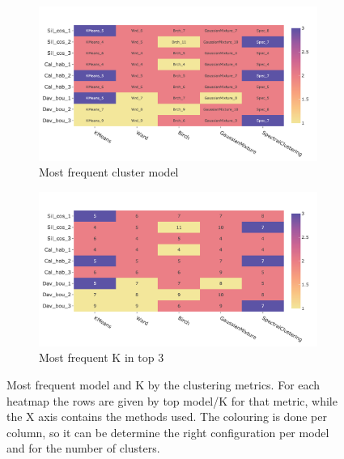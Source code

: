 \begin{figure}[!htb]
    \captionsetup[subfigure]{justification=Centering}
    \centering
    \begin{subfigure}[!t]{0.49\textwidth}
        \includegraphics[width=\textwidth]{Sections/ClusteringAnalysis/Resources/cs_top3/top3_cs_gen_top3_heatmap_pca.png}
        \caption{Most frequent cluster model}
        \label{fig:cs:heatmap_gen}
    \end{subfigure}
    \centering
    \begin{subfigure}[!t]{0.49\textwidth}
        \includegraphics[width=\textwidth]{Sections/ClusteringAnalysis/Resources/cs_top3/top3_cs_size_top3_heatmap_pca.png}
        \caption{Most frequent K in top 3}
        \label{fig:cs:heatmap_cs}
    \end{subfigure}
    \caption{Most frequent model and K by the clustering metrics. For each heatmap the rows are given by top model/K for that metric, while the X axis contains the methods used. The colouring is done per column, so it can be determine the right configuration per model and for the number of clusters.}
    \label{fig:cs:cs_metrics_heatmap}
\end{figure}

